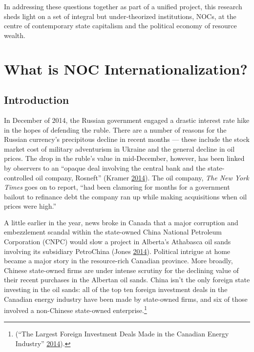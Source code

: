 \documentclass[11pt,]{book}
\begin{document}
In addressing these questions together as part of a unified project, this research sheds light on a set of integral but under-theorized institutions, NOCs, at the centre of contemporary state capitalism and the political economy of resource wealth.

\hypertarget{paper1}{%
\chapter{What is NOC Internationalization?}\label{paper1}}

\hypertarget{intro01}{%
\section{Introduction}\label{intro01}}

In December of 2014, the Russian government engaged a drastic interest rate hike in the hopes of defending the ruble. There are a number of reasons for the Russian currency's precipitous decline in recent months --- these include the stock market cost of military adventurism in Ukraine and the general decline in oil prices. The drop in the ruble's value in mid-December, however, has been linked by observers to an ``opaque deal involving the central bank and the state-controlled oil company, Rosneft'' (Kramer \protect\hyperlink{ref-kramer_russias_2014}{2014}). The oil company, \emph{The New York Times} goes on to report, ``had been clamoring for months for a government bailout to refinance debt the company ran up while making acquisitions when oil prices were high.''

A little earlier in the year, news broke in Canada that a major corruption and embezzlement scandal within the state-owned China National Petroleum Corporation (CNPC) would slow a project in Alberta's Athabasca oil sands involving its subsidiary PetroChina (Jones \protect\hyperlink{ref-jones_china_2014}{2014}). Political intrigue at home became a major story in the resource-rich Canadian province. More broadly, Chinese state-owned firms are under intense scrutiny for the declining value of their recent purchases in the Albertan oil sands. China isn't the only foreign state investing in the oil sands: all of the top ten foreign investment deals in the Canadian energy industry have been made by state-owned firms, and six of those involved a non-Chinese state-owned enterprise.\footnote{(``The Largest Foreign Investment Deals Made in the Canadian Energy Industry'' \protect\hyperlink{ref-noauthor_largest_2014}{2014}).}
\end{document}
